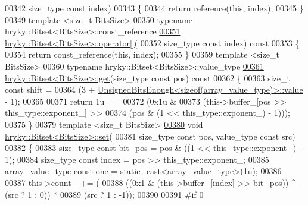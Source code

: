\begin{DoxyCode}
00342     size\_type \textcolor{keyword}{const} index)
00343 \{
00344     \textcolor{keywordflow}{return} reference(\textcolor{keyword}{this}, index);
00345 \}
00349 \textcolor{keyword}{template} <\textcolor{keywordtype}{size\_t} BitsSize>
00350 \textcolor{keyword}{typename} hryky::Bitset<BitsSize>::const\_reference 
\hypertarget{bitset_8h_source_l00351}{}\hyperlink{classhryky_1_1_bitset_aef5ad56f7ce6cb0bcbb7906979cc1890}{00351} \hyperlink{classhryky_1_1_bitset}{hryky::Bitset<BitsSize>::operator[]}(
00352     size\_type \textcolor{keyword}{const} index)\textcolor{keyword}{ const}
00353 \textcolor{keyword}{}\{
00354     \textcolor{keywordflow}{return} const\_reference(\textcolor{keyword}{this}, index);
00355 \}
00359 \textcolor{keyword}{template} <\textcolor{keywordtype}{size\_t} BitsSize>
00360 \textcolor{keyword}{typename} hryky::Bitset<BitsSize>::value\_type 
\hypertarget{bitset_8h_source_l00361}{}\hyperlink{classhryky_1_1_bitset_a35f36e917d8fe462a07d9a2b43d357a7}{00361} \hyperlink{namespacehryky_1_1log_1_1writer_a67d38d407be7aaf3cc9ed3ac8e3b2835}{hryky::Bitset<BitsSize>::get}(size\_type \textcolor{keyword}{const} pos)\textcolor{keyword}{ const}
00362 \textcolor{keyword}{}\{
00363     \textcolor{keywordtype}{size\_t} \textcolor{keyword}{const} shift =
00364         (3 + \hyperlink{classhryky_1_1_unsigned_bits_enough}{UnsignedBitsEnough<sizeof(array_value_type)>::value} - 1);
00365     
00371     \textcolor{keywordflow}{return} 1u ==
00372         (0x1u &
00373          (this->buffer\_[pos >> this\_type::exponent\_] >>
00374           (pos & (1 << this\_type::exponent\_) - 1)));
00375 \}
00379 \textcolor{keyword}{template} <\textcolor{keywordtype}{size\_t} BitsSize>
\hypertarget{bitset_8h_source_l00380}{}\hyperlink{classhryky_1_1_bitset_ac46ed5d5d5c98106ac330796a146d2a1}{00380} \textcolor{keywordtype}{void} \hyperlink{classhryky_1_1_bitset}{hryky::Bitset<BitsSize>::set}(
00381     size\_type \textcolor{keyword}{const} pos, value\_type \textcolor{keyword}{const} src)
00382 \{
00383     size\_type \textcolor{keyword}{const} bit\_pos = pos & ((1 << this\_type::exponent\_) - 1);
00384     size\_type \textcolor{keyword}{const} index = pos >> this\_type::exponent\_;
00385     \hyperlink{classhryky_1_1_unsigned_enough_exponent}{array_value_type} \textcolor{keyword}{const} one = \textcolor{keyword}{static\_cast<}\hyperlink{classhryky_1_1_unsigned_enough_exponent}{array_value_type}\textcolor{keyword}{>}(1u);
00386 
00387     this->count\_ += (
00388         ((0x1 & (this->buffer\_[index] >> bit\_pos)) ^ (src ? 1 : 0)) *
00389         (src ? 1 : -1));
00390 
00391 \textcolor{preprocessor}{#if 0}

\end{DoxyCode}
